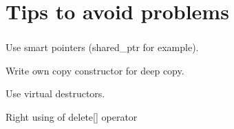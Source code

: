 \documentclass{bredelebeamer}
\begin{document}
\section{Tips to avoid problems}
\begin{frame}[fragile]
	\frametitle{}
	\begin{center}
		\begin{exampleblock}{}
			Use smart pointers (shared\_ptr for example).
		\end{exampleblock}
		\begin{exampleblock}{}
			Write own copy constructor for deep copy.
		\end{exampleblock}
		\begin{exampleblock}{}
			Use virtual destructors.
		\end{exampleblock}
		\begin{exampleblock}{}
		Right using of delete[] operator
		\end{exampleblock}
	\end{center}
\end{frame}
\end{document}
